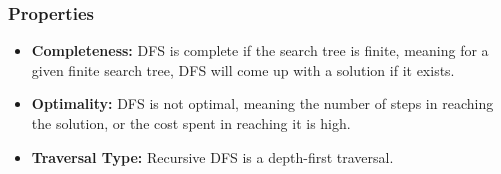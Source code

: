 \subsubsection*{Properties}
\begin{itemize}
    \item \textbf{Completeness:} DFS is complete if the search tree is finite, meaning for a given finite search tree, DFS will come up with a solution if it exists. 
    \item \textbf{Optimality:} DFS is not optimal, meaning the number of steps in reaching the solution, or the cost spent in reaching it is high. 
    \item \textbf{Traversal Type:} Recursive DFS is a depth-first traversal.
\end{itemize}
